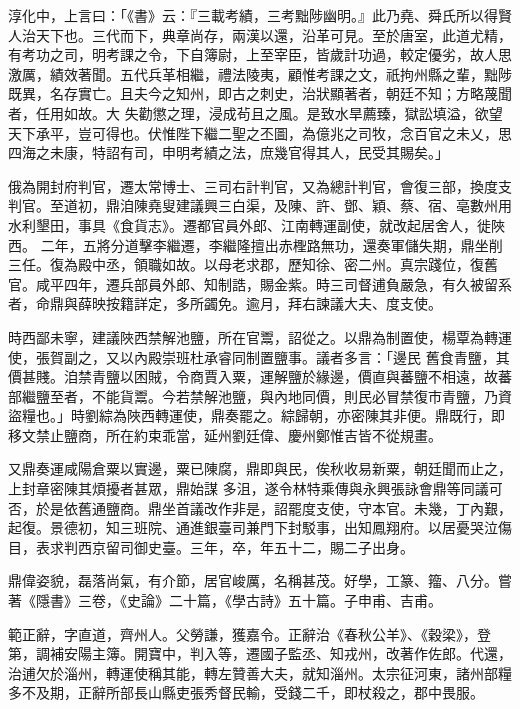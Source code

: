\begin{pinyinscope}
 淳化中，上言曰：「《書》云：『三載考績，三考黜陟幽明。』此乃堯、舜氏所以得賢人治天下也。三代而下，典章尚存，兩漢以還，沿革可見。至於唐室，此道尤精，有考功之司，明考課之令，下自簿尉，上至宰臣，皆歲計功過，較定優劣，故人思激厲，績效著聞。五代兵革相繼，禮法陵夷，顧惟考課之文，祇拘州縣之輩，黜陟既異，名存實亡。且夫今之知州，即古之刺史，治狀顯著者，朝廷不知；方略蔑聞者，任用如故。大
 失勸懲之理，浸成茍且之風。是致水旱薦臻，獄訟填溢，欲望天下承平，豈可得也。伏惟陛下繼二聖之丕圖，為億兆之司牧，念百官之未乂，思四海之未康，特詔有司，申明考績之法，庶幾官得其人，民受其賜矣。」



 俄為開封府判官，遷太常博士、三司右計判官，又為總計判官，會復三部，換度支判官。至道初，鼎洎陳堯叟建議興三白渠，及陳、許、鄧、穎、蔡、宿、亳數州用水利墾田，事具《食貨志》。遷都官員外郎、江南轉運副使，就改起居舍人，徙陜西。
 二年，五將分道擊李繼遷，李繼隆擅出赤檉路無功，還奏軍儲失期，鼎坐削三任。復為殿中丞，領職如故。以母老求郡，歷知徐、密二州。真宗踐位，復舊官。咸平四年，遷兵部員外郎、知制誥，賜金紫。時三司督逋負嚴急，有久被留系者，命鼎與薛映按籍詳定，多所蠲免。逾月，拜右諫議大夫、度支使。



 時西鄙未寧，建議陜西禁解池鹽，所在官鬻，詔從之。以鼎為制置使，楊覃為轉運使，張賀副之，又以內殿崇班杜承睿同制置鹽事。議者多言：「邊民
 舊食青鹽，其價甚賤。洎禁青鹽以困賊，令商賈入粟，運解鹽於緣邊，價直與蕃鹽不相遠，故蕃部繼鹽至者，不能貨鬻。今若禁解池鹽，與內地同價，則民必冒禁復市青鹽，乃資盜糧也。」時劉綜為陜西轉運使，鼎奏罷之。綜歸朝，亦密陳其非便。鼎既行，即移文禁止鹽商，所在約束乖當，延州劉廷偉、慶州鄭惟吉皆不從規畫。



 又鼎奏運咸陽倉粟以實邊，粟已陳腐，鼎即與民，俟秋收易新粟，朝廷聞而止之，上封章密陳其煩擾者甚眾，鼎始謀
 多沮，遂令林特乘傳與永興張詠會鼎等同議可否，於是依舊通鹽商。鼎坐首議改作非是，詔罷度支使，守本官。未幾，丁內艱，起復。景德初，知三班院、通進銀臺司兼門下封駁事，出知鳳翔府。以居憂哭泣傷目，表求判西京留司御史臺。三年，卒，年五十二，賜二子出身。



 鼎偉姿貌，磊落尚氣，有介節，居官峻厲，名稱甚茂。好學，工篆、籀、八分。嘗著《隱書》三卷，《史論》二十篇，《學古詩》五十篇。子申甫、吉甫。



 範正辭，字直道，齊州人。父勞謙，獲嘉令。正辭治《春秋公羊》、《穀梁》，登第，調補安陽主簿。開寶中，判入等，遷國子監丞、知戎州，改著作佐郎。代還，治逋欠於淄州，轉運使稱其能，轉左贊善大夫，就知淄州。太宗征河東，諸州部糧多不及期，正辭所部長山縣吏張秀督民輸，受錢二千，即杖殺之，郡中畏服。




\end{pinyinscope}
